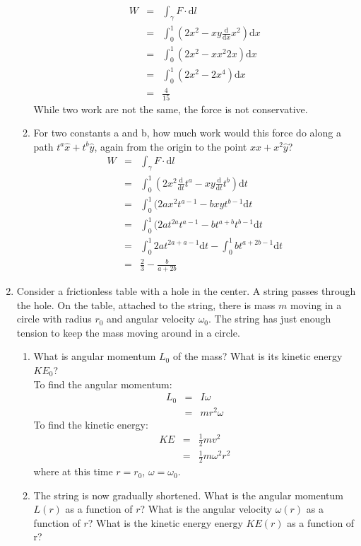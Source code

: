 \documentclass{article}
\newcommand{\de}{\mathrm{d}}
\begin{document}
\begin{enumerate}
\begin{enumerate}
        \begin{eqnarray*}
        W &=& \int_\gamma F \cdot \de l \\
        &=& \int_0^1 (2x^2 - xy \frac{\de}{\de x} x^2)\de x \\
        &=& \int_0^1 (2x^2 - xx^2 2x)\de x \\
        &=& \int_0^1 (2x^2 - 2x^4)\de x \\
        &=& \frac{4}{15}
        \end{eqnarray*}
        While two work are not the same, the force is not conservative.
        \item For two constants a and b, how much work would this force do along a path $t^a\hat{x}+t^b\hat{y}$, again from the origin to the point $x\hat{x} + x^2\hat{y}$? \\

        \begin{eqnarray*}
        W &=& \int_\gamma F \cdot \de l \\
        &=& \int_0^1 (2x^2\frac{\de}{\de t}t^a - xy \frac{\de}{\de t}t^b) \de t\\
        &=& \int_0^1 (2ax^2t^{a-1} - bxy t^{b-1} \de t \\
        &=& \int_0^1 (2at^{2a}t^{a-1} - bt^{a+b} t^{b-1} \de t \\
        &=& \int_0^1 2at^{2a+a-1}\de t - \int_0^1 bt^{a+2b-1}\de t \\
        &=& \frac{2}{3} - \frac{b}{a+2b}
        \end{eqnarray*}
    \end{enumerate}
        \item Consider a frictionless table with a hole in the center. A string passes through the hole. On the table, attached to the string, there is mass $m$ moving in a circle with radius $r_0$ and angular velocity $\omega_0$. The string has just enough tension to keep the mass moving around in a circle.
        \begin{enumerate}
            \item What is angular momentum $L_0$ of the mass? What is its kinetic energy $KE_0$?\\

            To find the angular momentum:
            \begin{eqnarray*}
            L_0 &=& I\omega \\
            &=& mr^2 \omega
            \end{eqnarray*}
            To find the kinetic energy:
            \begin{eqnarray*}
            KE &=& \frac{1}{2} m v^2\\
            &=& \frac{1}{2} m \omega^2r^2
            \end{eqnarray*}
            where at this time $r = r_0$, $\omega = \omega_0$.
            \item The string is now gradually shortened. What is the angular momentum $L(r)$ as a function of $r$? What is the angular velocity $\omega(r)$ as a function of $r$? What is the kinetic energy energy $KE(r)$ as a function of r? \\


\end{enumerate}
\end{enumerate}
\end{document}
